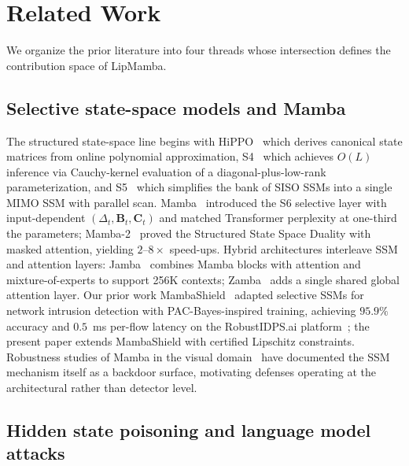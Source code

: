 \documentclass[12pt,a4paper]{article}
\theoremstyle{definition}
\theoremstyle{remark}
\newcommand{\modelname}{LipMamba}
\begin{document}
\section{Related Work}
\label{sec:related}

We organize the prior literature into four threads whose intersection defines the contribution space of \modelname{}.

\subsection{Selective state-space models and Mamba}

The structured state-space line begins with HiPPO~\cite{gu2020hippo} which derives canonical state matrices from online polynomial approximation, S4~\cite{gu2022s4} which achieves $O(L)$ inference via Cauchy-kernel evaluation of a diagonal-plus-low-rank parameterization, and S5~\cite{smith2023s5} which simplifies the bank of SISO SSMs into a single MIMO SSM with parallel scan. Mamba~\cite{gu2024mamba} introduced the S6 selective layer with input-dependent $(\Delta_t, \mathbf{B}_t, \mathbf{C}_t)$ and matched Transformer perplexity at one-third the parameters; Mamba-2~\cite{dao2024mamba2} proved the Structured State Space Duality with masked attention, yielding $2$--$8\times$ speed-ups. Hybrid architectures interleave SSM and attention layers: Jamba~\cite{lieber2024jamba} combines Mamba blocks with attention and mixture-of-experts to support 256K contexts; Zamba~\cite{glorioso2024zamba} adds a single shared global attention layer. Our prior work MambaShield~\cite{anaedevha2025mambashield} adapted selective SSMs for network intrusion detection with PAC-Bayes-inspired training, achieving $95.9\%$ accuracy and $0.5$~ms per-flow latency on the RobustIDPS.ai platform~\cite{anaedevha2026robustidps}; the present paper extends MambaShield with certified Lipschitz constraints. Robustness studies of Mamba in the visual domain~\cite{du2024robustness,malik2025evaluating,guo2025badvim} have documented the SSM mechanism itself as a backdoor surface, motivating defenses operating at the architectural rather than detector level.

\subsection{Hidden state poisoning and language model attacks}
\end{document}
